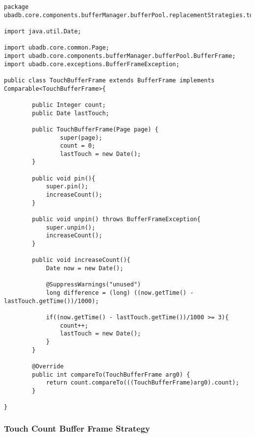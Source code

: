 \begin{lstlisting}
package ubadb.core.components.bufferManager.bufferPool.replacementStrategies.touchcount;

import java.util.Date;

import ubadb.core.common.Page;
import ubadb.core.components.bufferManager.bufferPool.BufferFrame;
import ubadb.core.exceptions.BufferFrameException;

public class TouchBufferFrame extends BufferFrame implements Comparable<TouchBufferFrame>{
        
		public Integer count;
		public Date lastTouch;
	
        public TouchBufferFrame(Page page) {
                super(page);
                count = 0;
                lastTouch = new Date();
        }
        
        public void pin(){
        	super.pin();
        	increaseCount();
        }
        
        public void unpin() throws BufferFrameException{
        	super.unpin();
        	increaseCount();
        }
        
        public void increaseCount(){
        	Date now = new Date();
        	
        	@SuppressWarnings("unused")
			long difference = (long) ((now.getTime() - lastTouch.getTime())/1000);
        	
        	if((now.getTime() - lastTouch.getTime())/1000 >= 3){
        		count++;
        		lastTouch = new Date();
        	}
        }

		@Override
		public int compareTo(TouchBufferFrame arg0) {
			return count.compareTo(((TouchBufferFrame)arg0).count);
		}

}
\end{lstlisting}

\subsubsection{Touch Count Buffer Frame Strategy}

